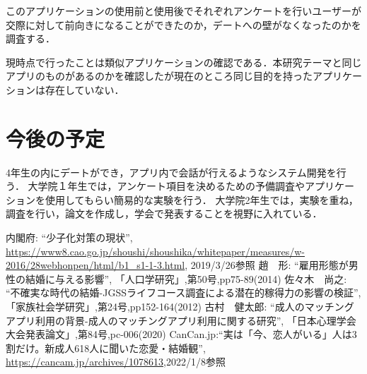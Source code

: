 \documentclass[12pt]{ltjsarticle}
\begin{document}
このアプリケーションの使用前と使用後でそれぞれアンケートを行いユーザーが交際に対して前向きになることができたのか，デートへの壁がなくなったのかを調査する．

現時点で行ったことは類似アプリケーションの確認である．本研究テーマと同じアプリのものがあるのかを確認したが現在のところ同じ目的を持ったアプリケーションは存在していない．




\section{今後の予定}
4年生の内にデートができ，アプリ内で会話が行えるようなシステム開発を行う．
大学院１年生では，アンケート項目を決めるための予備調査やアプリケーションを使用してもらい簡易的な実験を行う．
大学院2年生では，実験を重ね，調査を行い，論文を作成し，学会で発表することを視野に入れている．

\begin{thebibliography}{99}
 内閣府: ``少子化対策の現状'', \url{https://www8.cao.go.jp/shoushi/shoushika/whitepaper/measures/w-2016/28webhonpen/html/b1_s1-1-3.html}, 2019/3/26参照
 趙　形: ``雇用形態が男性の結婚に与える影響'', 「人口学研究」,第50号,pp75-89(2014)
 佐々木　尚之: ``不確実な時代の結婚-JGSSライフコース調査による潜在的稼得力の影響の検証'', 「家族社会学研究」,第24号,pp152-164(2012)
 古村　健太郎: ``成人のマッチングアプリ利用の背景-成人のマッチングアプリ利用に関する研究'', 「日本心理学会大会発表論文」,第84号,pc-006(2020)
CanCan.jp:``実は「今、恋人がいる」人は3割だけ。新成人618人に聞いた恋愛・結婚観'',
\url{https://cancam.jp/archives/1078613},2022/1/8参照
\end{thebibliography}
\end{document}
